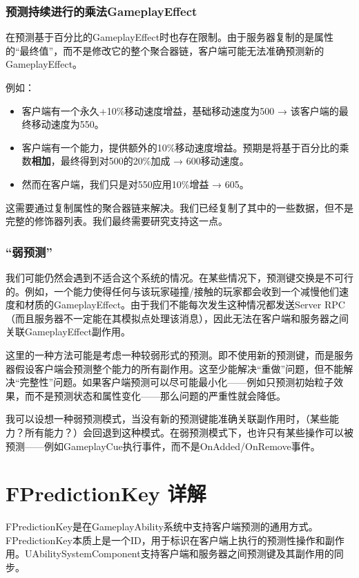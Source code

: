 \documentclass[10pt,CJKmath]{ctexart}
\begin{document}
\subsubsection{预测持续进行的乘法GameplayEffect}
在预测基于百分比的GameplayEffect时也存在限制。由于服务器复制的是属性的“最终值”，而不是修改它的整个聚合器链，客户端可能无法准确预测新的GameplayEffect。

例如：
\begin{itemize}
	\item 客户端有一个永久+10\%移动速度增益，基础移动速度为500 → 该客户端的最终移动速度为550。
	\item 客户端有一个能力，提供额外的10\%移动速度增益。预期是将基于百分比的乘数\textbf{相加}，最终得到对500的20\%加成 → 600移动速度。
	\item 然而在客户端，我们只是对550应用10\%增益 → 605。
\end{itemize}

这需要通过复制属性的聚合器链来解决。我们已经复制了其中的一些数据，但不是完整的修饰器列表。我们最终需要研究支持这一点。

\subsubsection{“弱预测”}
我们可能仍然会遇到不适合这个系统的情况。在某些情况下，预测键交换是不可行的。例如，一个能力使得任何与该玩家碰撞/接触的玩家都会收到一个减慢他们速度和材质的GameplayEffect。由于我们不能每次发生这种情况都发送Server RPC（而且服务器不一定能在其模拟点处理该消息），因此无法在客户端和服务器之间关联GameplayEffect副作用。

这里的一种方法可能是考虑一种较弱形式的预测。即不使用新的预测键，而是服务器假设客户端会预测整个能力的所有副作用。这至少能解决“重做”问题，但不能解决“完整性”问题。如果客户端预测可以尽可能最小化——例如只预测初始粒子效果，而不是预测状态和属性变化——那么问题的严重性就会降低。

我可以设想一种弱预测模式，当没有新的预测键能准确关联副作用时，（某些能力？所有能力？）会回退到这种模式。在弱预测模式下，也许只有某些操作可以被预测——例如GameplayCue执行事件，而不是OnAdded/OnRemove事件。

\section{FPredictionKey 详解}

FPredictionKey是在GameplayAbility系统中支持客户端预测的通用方式。FPredictionKey本质上是一个ID，用于标识在客户端上执行的预测性操作和副作用。UAbilitySystemComponent支持客户端和服务器之间预测键及其副作用的同步。
\end{document}
